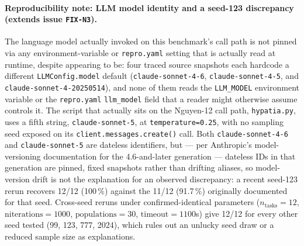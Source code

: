 \documentclass[twoside,11pt]{article}
\begin{document}
\paragraph{Reproducibility note: LLM model identity and a seed-123
discrepancy (extends issue \texttt{FIX-N3}).} The language model actually
invoked on this benchmark's call path is not pinned via any
environment-variable or \texttt{repro.yaml} setting that is actually read
at runtime, despite appearing to be: four traced source snapshots each
hardcode a different \texttt{LLMConfig.model} default
(\texttt{claude-sonnet-4-6}, \texttt{claude-sonnet-4-5}, and
\texttt{claude-sonnet-4-20250514}), and none of them reads the
\texttt{LLM\_MODEL} environment variable or the \texttt{repro.yaml}
\texttt{llm\_model} field that a reader might otherwise assume controls
it. The script that actually sits on the Nguyen-12 call path,
\texttt{hypatia.py}, uses a fifth string, \texttt{claude-sonnet-5}, at
\texttt{temperature=0.25}, with no sampling seed exposed on its
\texttt{client.messages.create()} call. Both \texttt{claude-sonnet-4-6}
and \texttt{claude-sonnet-5} are dateless identifiers, but --- per
Anthropic's model-versioning documentation for the 4.6-and-later
generation --- dateless IDs in that generation are pinned, fixed
snapshots rather than drifting aliases, so model-version drift is not the
explanation for an observed discrepancy: a recent seed-123 rerun recovers
12/12 (100\,\%) against the 11/12 (91.7\,\%) originally documented for
that seed. Cross-seed reruns under confirmed-identical parameters
($n_{\text{tasks}}=12$, $\text{niterations}=1000$, $\text{populations}=30$,
$\text{timeout}=1100$s) give 12/12 for every other seed tested (99, 123,
777, 2024), which rules out an unlucky seed draw or a reduced sample size
as explanations.
\end{document}
